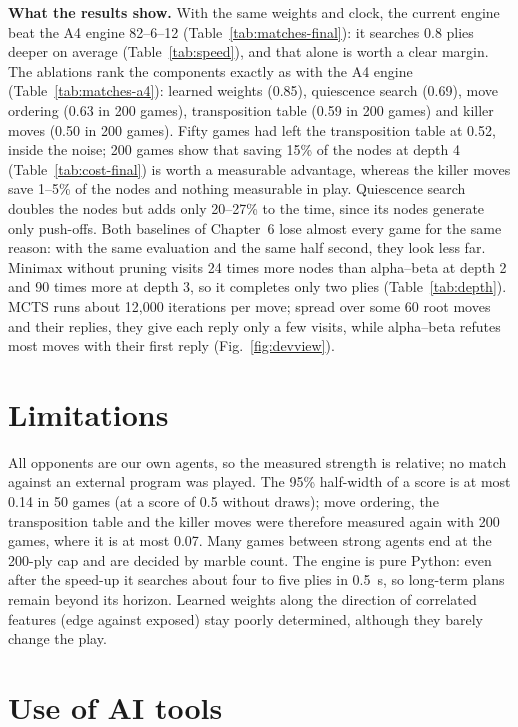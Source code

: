 \documentclass[a4paper,10pt]{article}
\begin{document}




\textbf{What the results show.} With the same weights and clock, the current engine beat the A4 engine
82--6--12 (Table~\ref{tab:matches-final}): it searches 0.8 plies deeper on average (Table~\ref{tab:speed}), and
that alone is worth a clear margin. The ablations rank the components exactly as with the A4 engine
(Table~\ref{tab:matches-a4}): learned weights (0.85), quiescence search (0.69), move ordering (0.63 in 200 games),
transposition table (0.59 in 200 games) and killer moves (0.50 in 200 games). Fifty games had left the
transposition table at 0.52, inside the noise; 200 games show that saving 15\% of the nodes at depth 4
(Table~\ref{tab:cost-final}) is worth a measurable advantage, whereas the killer moves save 1--5\% of the nodes and
nothing measurable in play. Quiescence search doubles the nodes but adds only 20--27\% to the time, since its nodes
generate only push-offs. Both baselines of Chapter~6 lose almost every game for the same reason: with the same
evaluation and the same half second, they look less far. Minimax without pruning visits 24 times more nodes than
alpha--beta at depth 2 and 90 times more at depth 3, so it completes only two plies (Table~\ref{tab:depth}). MCTS
runs about 12,000 iterations per move; spread over some 60 root moves and their replies, they give each reply only
a few visits, while alpha--beta refutes most moves with their first reply (Fig.~\ref{fig:devview}).

\section{Limitations}

All opponents are our own agents, so the measured strength is relative; no match against an external program was
played. The 95\% half-width of a score is at most 0.14 in 50 games (at a score of 0.5 without draws); move ordering, the
transposition table and the killer moves were therefore measured again with 200 games, where it is at most 0.07. Many games between strong agents end at the 200-ply cap and are decided by
marble count. The engine is pure Python: even after the speed-up it searches about four to five plies in 0.5~s, so
long-term plans remain beyond its horizon. Learned weights along the direction of correlated features (edge against
exposed) stay poorly determined, although they barely change the play.

\section{Use of AI tools}
\label{sec:ai}
\end{document}
